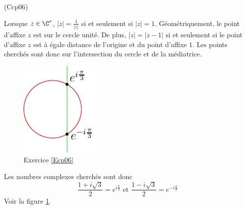 \begin{tiny}(Ccp06)\end{tiny} \label{Ecp06} Lorsque $z \in \C^*$, $|z|=\frac{1}{|z|}$ si et seulement si $|z|=1$. Géométriquement, le point d'affixe $z$ est sur le cercle unité.\newline
De plus, $|z|=|z-1|$ si et seulement si le point d'affixe $z$ est à égale distance de l'origine et du point d'affixe $1$. Les points cherchés sont donc sur l'intersection du cercle et de la médiatrice.
\begin{figure}[h!]
 \centering
 \includegraphics{./Ccp06_1.pdf}
 \caption{Exercice \ref{Ecp06}}
 \label{fig:Ccp06_1}
\end{figure}
Les nombres complexes cherchés sont donc
\begin{displaymath}
 \frac{1+i\sqrt{3}}{2}=e^{i\frac{\pi}{3}}\text{ et }\frac{1-i\sqrt{3}}{2}=e^{-i\frac{\pi}{3}}
\end{displaymath}
Voir la figure \ref{fig:Ccp06_1}.  
